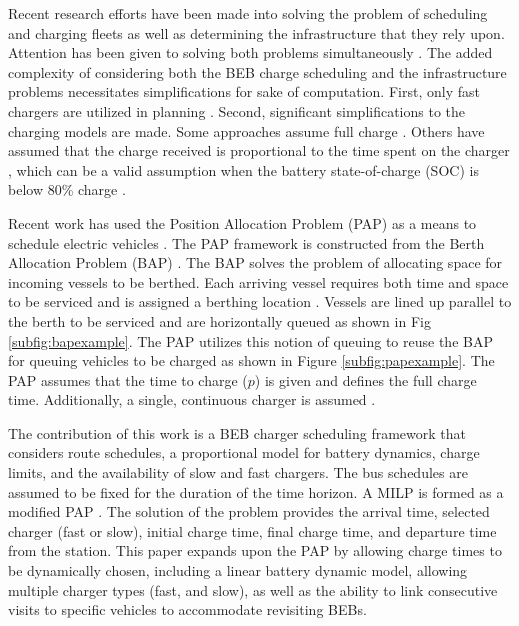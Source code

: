 \documentclass[letterpaper, 10pt, conference]{IEEEtran}
\begin{document}
Recent research efforts have been made into solving the problem of scheduling and charging fleets as well as determining the infrastructure that they rely upon. Attention has been given to solving both problems simultaneously \cite{Wei2018, Sebastiani2016, Hoke2014, Wang2017}.  The added complexity of considering both the BEB charge scheduling and the infrastructure problems necessitates simplifications for sake of computation. First, only fast chargers are utilized in planning \cite{Wei2018, Sebastiani2016, Wang2017, Zhou2020, Liu2020, Yang2018, Wang2017a, Qin2016}. Second, significant simplifications to the charging models are made. Some approaches assume full charge \cite{Wei2018, Wang2017, Zhou2020, Wang2017a}. Others have assumed that the charge received is proportional to the time spent on the charger \cite{Liu2020, Yang2018}, which can be a valid assumption when the battery state-of-charge (SOC) is below 80\% charge \cite{Liu2020}.

Recent work has used the Position Allocation Problem (PAP) as a means to schedule electric vehicles \cite{Qarebagh2019}. The PAP framework is constructed from the Berth Allocation Problem (BAP) \cite{Qarebagh2019}. The BAP solves the problem of allocating space for incoming vessels to be berthed. Each arriving vessel requires both time and space to be serviced and is assigned a berthing location \cite{Imai2001}. Vessels are lined up parallel to the berth to be serviced and are horizontally queued as shown in Fig \ref{subfig:bapexample}. The PAP utilizes this notion of queuing to reuse the BAP for queuing vehicles to be charged as shown in Figure \ref{subfig:papexample}. The PAP assumes that the time to charge (\(p\)) is given and defines the full charge time. Additionally, a single, continuous charger is assumed \cite{Qarebagh2019}.

The contribution of this work is a BEB charger scheduling framework that considers route schedules, a proportional model for battery dynamics, charge limits, and the availability of slow and fast chargers. The bus schedules are assumed to be fixed for the duration of the time horizon. A MILP is formed as a modified PAP \cite{Qarebagh2019}. The solution of the problem provides the arrival time, selected charger (fast or slow), initial charge time, final charge time, and departure time from the station. This paper expands upon the PAP by allowing charge times to be dynamically chosen, including a linear battery dynamic model, allowing multiple charger types (fast, and slow), as well as the ability to link consecutive visits to specific vehicles to accommodate revisiting BEBs.
\end{document}
